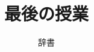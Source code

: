 \documentclass[10pt]{amsart}
\title{最後の授業}
\author{辞書}
\begin{document}
	\maketitle
	\thispagestyle{empty}
	\vspace{1em}

	\begin{multicols}{2}\noindent
		
	\end{multicols}
\end{document}
